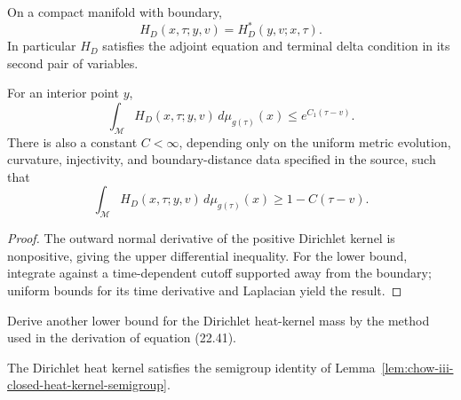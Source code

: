 \begin{lemma}
\label{lem:chow-iii-dirichlet-heat-adjoint-symmetry}
On a compact manifold with boundary,
\[
 H_D(x,\tau;y,v)=H_D^*(y,v;x,\tau).
\]
In particular \(H_D\) satisfies the adjoint equation and terminal delta
condition in its second pair of variables.
\end{lemma}

\begin{lemma}
\label{lem:chow-iii-dirichlet-heat-kernel-mass-bounds}
For an interior point \(y\),
\[
 \int_{\mathcal M}H_D(x,\tau;y,v)\,d\mu_{g(\tau)}(x)
 \le e^{C_1(\tau-v)}.
\]
There is also a constant \(C<\infty\), depending only on the uniform metric
evolution, curvature, injectivity, and boundary-distance data specified in
the source, such that
\[
 \int_{\mathcal M}H_D(x,\tau;y,v)\,d\mu_{g(\tau)}(x)
 \ge 1-C(\tau-v).
\]
\end{lemma}
\begin{proof}
The outward normal derivative of the positive Dirichlet kernel is
nonpositive, giving the upper differential inequality.  For the lower bound,
integrate against a time-dependent cutoff supported away from the boundary;
uniform bounds for its time derivative and Laplacian yield the result.
\end{proof}

\begin{claim}
\label{clm:chow-iii-dirichlet-mass-lower-bound-exercise}
Derive another lower bound for the Dirichlet heat-kernel mass by the method
used in the derivation of equation (22.41).
\end{claim}

\begin{lemma}
\label{lem:chow-iii-dirichlet-heat-kernel-semigroup}
The Dirichlet heat kernel satisfies the semigroup identity of
Lemma~\ref{lem:chow-iii-closed-heat-kernel-semigroup}.
\end{lemma}

